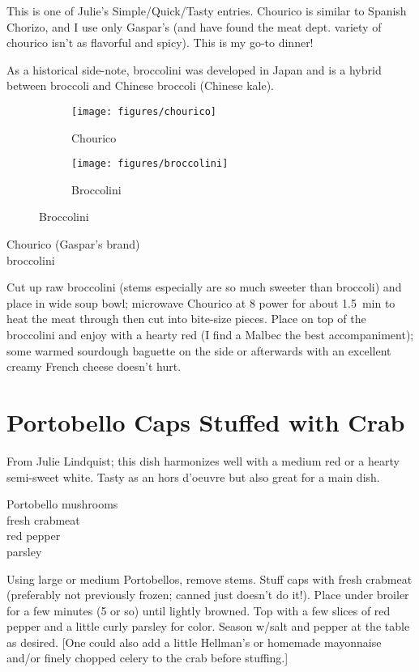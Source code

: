 \begin{open}
    This is one of Julie's Simple/Quick/Tasty entries.  Chourico is similar to
    Spanish Chorizo, and I use only Gaspar’s (and have found the meat dept.
    variety of chourico isn’t as flavorful and spicy). This is my go-to dinner!

    As a historical side-note, broccolini was developed in Japan and is a hybrid
    between broccoli and Chinese broccoli (Chinese kale).
\end{open}
\begin{figure}[h]
\centering
    \begin{subfigure}[c]{0.25\textwidth}
        \texttt{[image: figures/chourico]}
        \caption{Chourico}
    \end{subfigure}
    \begin{subfigure}[c]{0.25\textwidth}
        \texttt{[image: figures/broccolini]}
        \caption{Broccolini}
    \end{subfigure}
\end{figure}
\begin{ingredients}
    Chourico (Gaspar's brand)\\
    broccolini
\end{ingredients}
Cut up raw broccolini (stems especially are so much sweeter than broccoli) and
place in wide soup bowl; microwave Chourico at 8 power for about
\SI{1.5}{\minute} to heat the meat through then cut into bite-size pieces.
Place on top of the broccolini and enjoy with a hearty red (I find a Malbec the
best accompaniment); some warmed sourdough baguette on the side or afterwards
with an excellent creamy French cheese doesn’t hurt.

\section{Portobello Caps Stuffed with Crab
}

\begin{open}
    From Julie Lindquist; this dish harmonizes well with a medium red or a hearty semi-sweet white. Tasty as an hors d'oeuvre but also great for a main dish.
\end{open}
\begin{ingredients}
    Portobello mushrooms\\
    fresh crabmeat\\
    red pepper\\
    parsley
\end{ingredients}
Using large or medium Portobellos, remove stems. Stuff caps with fresh crabmeat (preferably not previously frozen; canned just doesn't do it!). Place under broiler for a few minutes (5 or so) until lightly browned. Top with a few slices of red pepper and a little curly parsley for color. Season w/salt and pepper at the table as desired.  [One could also add a little Hellman’s or homemade mayonnaise and/or finely chopped celery to the crab before stuffing.]

